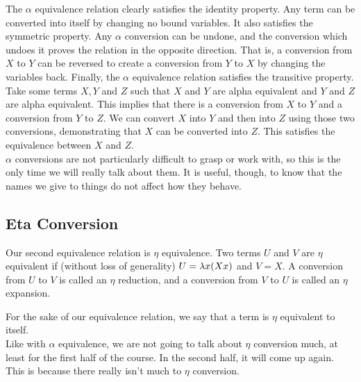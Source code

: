 The $\alpha$ equivalence relation clearly satisfies the identity property. Any term can be converted into itself by changing no bound variables. It also satisfies the symmetric property. Any $\alpha$ conversion can be undone, and the conversion which undoes it proves the relation in the opposite direction. That is, a conversion from $X$ to $Y$ can be reversed to create a conversion from $Y$ to $X$ by changing the variables back. Finally, the $\alpha$ equivalence relation satisfies the transitive property. Take some terms $X, Y$ and $Z$ such that $X$ and $Y$ are alpha equivalent and $Y$ and $Z$ are alpha equivalent. This implies that there is a conversion from $X$ to $Y$ and a conversion from $Y$ to $Z$. We can convert $X$ into $Y$ and then into $Z$ using those two conversions, demonstrating that $X$ can be converted into $Z$. This satisfies the equivalence between $X$ and $Z$.\\

$\alpha$ conversions are not particularly difficult to grasp or work with, so this is the only time we will really talk about them. It is useful, though, to know that the names we give to things do not affect how they behave.\\

\subsection{Eta Conversion}
Our second equivalence relation is $\eta$ equivalence. Two terms $U$ and $V$ are $\eta$ equivalent if (without loss of generality) $U = \lambda x(Xx)$ and $V = X$. A conversion from $U$ to $V$ is called an $\eta$ reduction, and a conversion from $V$ to $U$ is called an $\eta$ expansion.\\

For the sake of our equivalence relation, we say that a term is $\eta$ equivalent to itself.\\

Like with $\alpha$ equivalence, we are not going to talk about $\eta$ conversion much, at least for the first half of the course. In the second half, it will come up again. This is because there really isn't much to $\eta$ conversion.

